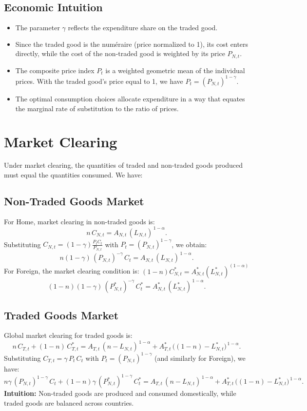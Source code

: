 \documentclass[a4paper,12pt]{article} %
\theoremstyle{nonitalic}
\begin{document}
\subsection*{Economic Intuition}
\begin{itemize}
    \item The parameter $\gamma$ reflects the expenditure share on the traded good.
    \item Since the traded good is the num\'eraire (price normalized to 1), its cost enters directly, while the cost of the non-traded good is weighted by its price $P_{N,t}$.
    \item The composite price index $P_t$ is a weighted geometric mean of the individual prices. With the traded good’s price equal to 1, we have $P_t = (P_{N,t})^{1-\gamma}$.
    \item The optimal consumption choices allocate expenditure in a way that equates the marginal rate of substitution to the ratio of prices.
\end{itemize}

\section{Market Clearing}
Under market clearing, the quantities of traded and non-traded goods produced must equal the quantities consumed. We have:
\subsection*{Non-Traded Goods Market}
For Home, market clearing in non-traded goods is:
\[
n\,C_{N,t} = A_{N,t}\,(L_{N,t})^{\,1-\alpha}.
\]
Substituting $ C_{N,t} = (1-\gamma)\frac{P_t C_t}{P_{N,t}}$ with $ P_t = (P_{N,t})^{1-\gamma} $, we obtain:
\[
\boxed{n(1-\gamma)\,(P_{N,t})^{-\gamma}\,C_t = A_{N,t}\,(L_{N,t})^{\,1-\alpha}.}
\]
For Foreign, the market clearing condition is: $(1-n)C_{N,t}^* = A_{N,t}^*(L_{N,t}^*)^{(1-\alpha)}$
\[
\boxed{(1-n)(1-\gamma)\,(P^*_{N,t})^{-\gamma}\,C^*_t = A^*_{N,t}\,(L^*_{N,t})^{\,1-\alpha}.}
\]

\subsection*{Traded Goods Market}
Global market clearing for traded goods is:
\[
n\,C_{T,t} + (1-n)\,C^*_{T,t} = A_{T,t}\,(n-L_{N,t})^{\,1-\alpha} + A^*_{T,t}\,\big((1-n)-L^*_{N,t}\big)^{\,1-\alpha}.
\]
Substituting $ C_{T,t}=\gamma\,P_t\,C_t $ with $ P_t=(P_{N,t})^{1-\gamma} $ (and similarly for Foreign), we have:
\[
\boxed{n\gamma\,(P_{N,t})^{1-\gamma}\,C_t + (1-n)\gamma\,(P^*_{N,t})^{1-\gamma}\,C^*_t = A_{T,t}\,(n-L_{N,t})^{\,1-\alpha} + A^*_{T,t}\,\big((1-n)-L^*_{N,t}\big)^{\,1-\alpha}.}
\]
\textbf{Intuition:} Non-traded goods are produced and consumed domestically, while traded goods are balanced across countries.
\end{document}
